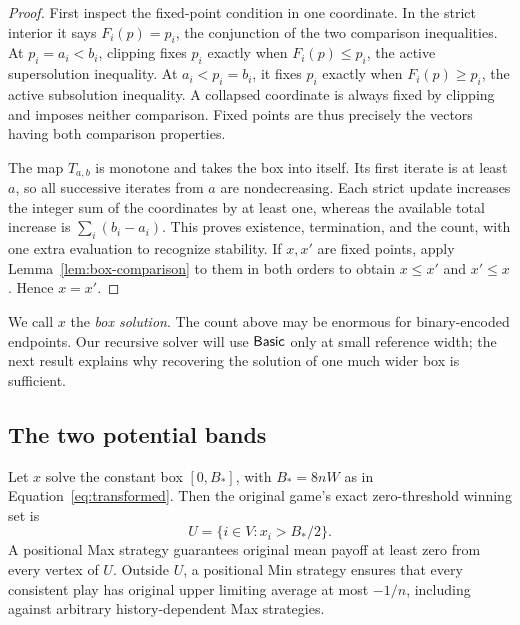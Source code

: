 \begin{proof}
First inspect the fixed-point condition in one coordinate. In the strict
interior it says $F_i(p)=p_i$, the conjunction of the two comparison
inequalities. At $p_i=a_i<b_i$, clipping fixes $p_i$ exactly when
$F_i(p)\le p_i$, the active supersolution inequality. At
$a_i<p_i=b_i$, it fixes $p_i$ exactly when $F_i(p)\ge p_i$, the active
subsolution inequality. A collapsed coordinate is always fixed by
clipping and imposes neither comparison. Fixed points are thus precisely
the vectors having both comparison properties.

The map $T_{a,b}$ is monotone and takes the box into itself. Its first
iterate is at least $a$, so all successive iterates from $a$ are
nondecreasing. Each strict update increases the integer sum of the
coordinates by at least one, whereas the available total increase is
$\sum_i(b_i-a_i)$. This proves existence, termination, and the count,
with one extra evaluation to recognize stability. If $x,x'$ are fixed
points, apply Lemma~\ref{lem:box-comparison} to them in both orders to
obtain $x\le x'$ and $x'\le x$. Hence $x=x'$.
\end{proof}

We call $x$ the \emph{box solution}. The count above may be enormous for
binary-encoded endpoints. Our recursive solver will use $\mathsf{Basic}$ only
at small reference width; the next result explains why recovering the
solution of one much wider box is sufficient.

\subsection{The two potential bands}

\begin{proposition}\label{prop:game-reduction}
Let $x$ solve the constant box $[0,B_*]$, with $B_*=8nW$ as in
Equation~\eqref{eq:transformed}. Then the original game's exact
zero-threshold winning set is
\[
 U=\{i\in V:x_i>B_*/2\}.
\]
A positional Max strategy guarantees original mean payoff at least zero
from every vertex of $U$. Outside $U$, a positional Min strategy ensures
that every consistent play has original upper limiting average at most
$-1/n$, including against arbitrary history-dependent Max strategies.
\end{proposition}

